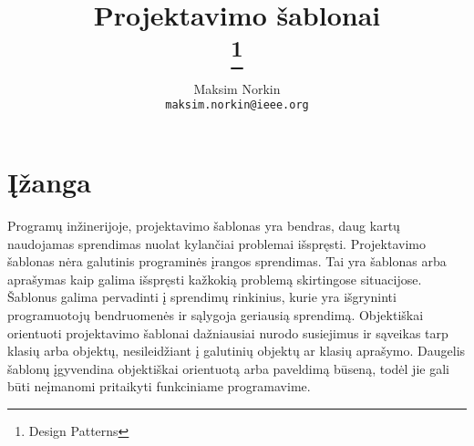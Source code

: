 \documentclass[10pt]{IEEEtran}
\author{Maksim Norkin\\ \texttt{maksim.norkin@ieee.org}}
\title{Projektavimo šablonai \\ \footnote{Design Patterns}}
\begin{document}
	\maketitle

	\section{Įžanga}

		Programų inžinerijoje, projektavimo šablonas yra bendras, daug kartų naudojamas sprendimas nuolat kylančiai problemai išspręsti. Projektavimo šablonas nėra galutinis programinės įrangos sprendimas. Tai yra šablonas arba aprašymas kaip galima išspręsti kažkokią problemą skirtingose situacijose. Šablonus galima pervadinti į sprendimų rinkinius, kurie yra išgryninti programuotojų bendruomenės ir sąlygoja geriausią sprendimą. Objektiškai orientuoti projektavimo šablonai dažniausiai nurodo susiejimus ir sąveikas tarp klasių arba objektų, nesileidžiant į galutinių objektų ar klasių aprašymo. Daugelis šablonų įgyvendina objektiškai orientuotą arba paveldimą būseną, todėl jie gali būti neįmanomi pritaikyti funkciniame programavime. %

		
\end{document}
